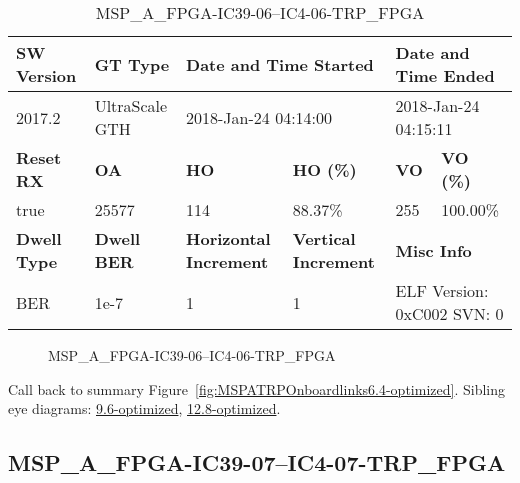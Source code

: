 \begin{table}[h]
\centering
\caption{MSP\_A\_FPGA-IC39-06--IC4-06-TRP\_FPGA}
\label{tab:MSPAFPGAIC3906IC406TRPFPGA6.4-optimized}
\begin{tabular}{@{}|l|l|l|l|l|l|@{}}
\toprule
\textbf{SW Version}                & \textbf{GT Type}   & \multicolumn{2}{l|}{\textbf{Date and Time Started}}            & \multicolumn{2}{l|}{\textbf{Date and Time Ended}}        \\ \midrule
2017.2                       & UltraScale GTH          & \multicolumn{2}{l|}{2018-Jan-24 04:14:00}                   & \multicolumn{2}{l|}{2018-Jan-24 04:15:11}               \\ \midrule
\textbf{Reset RX}                  & \textbf{OA} & \textbf{HO}   & \textbf{HO (\%)} & \textbf{VO} & \textbf{VO (\%)} \\ \midrule
true & 25577        & 114          & 88.37\%        & 255        & 100.00\%       \\ \midrule
\textbf{Dwell Type}                & \textbf{Dwell BER} & \textbf{Horizontal Increment} & \textbf{Vertical Increment}    & \multicolumn{2}{l|}{\textbf{Misc Info}}                  \\ \midrule
BER                            & 1e-7        & 1        & 1           & \multicolumn{2}{l|}{ELF Version: 0xC002 SVN: 0}                         \\ \bottomrule
\end{tabular}
\end{table}

\begin{figure}[h]
\caption{MSP\_A\_FPGA-IC39-06--IC4-06-TRP\_FPGA} \label{fig:MSPAFPGAIC3906IC406TRPFPGA6.4-optimized}
\end{figure}

Call back to summary Figure~\ref{fig:MSPATRPOnboardlinks6.4-optimized}.
Sibling eye diagrams: \hyperref[sec:MSPAFPGAIC3906IC406TRPFPGA9.6-optimized]{9.6-optimized}, \hyperref[sec:MSPAFPGAIC3906IC406TRPFPGA12.8-optimized]{12.8-optimized}.

\clearpage
\newpage


\subsection{MSP\_A\_FPGA-IC39-07--IC4-07-TRP\_FPGA}\label{sec:MSPAFPGAIC3907IC407TRPFPGA6.4-optimized}

